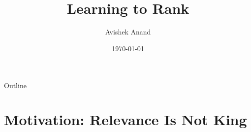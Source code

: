 \documentclass[aspectratio=169]{beamer}
\title{Learning to Rank}
\author{Avishek Anand}
\date{\today}
\begin{document}
\begin{frame}[plain]
\titlepage
\end{frame}

\begin{frame}{Outline}
\tableofcontents
\end{frame}




\section{Motivation: Relevance Is Not King}
\end{document}
